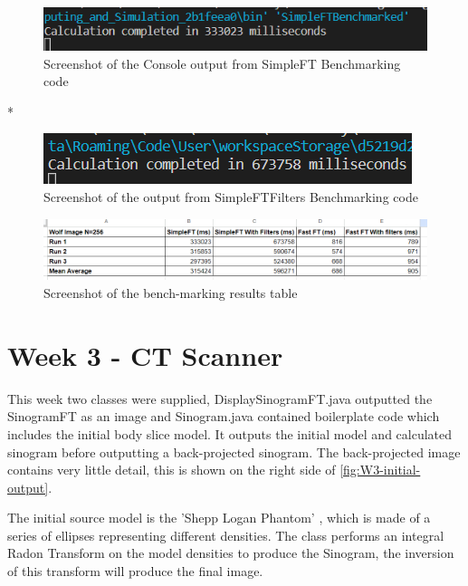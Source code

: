     \begin{figure}[H] 
        \centering
        \includegraphics[width=0.8\columnwidth]{Figures/Week 2/SimpleFT Bench.png}
        \caption{Screenshot of the Console output from SimpleFT Benchmarking code}
        \label{fig:SimpleFT-Bench}
    \end{figure}
*
    \begin{figure}[H] 
        \centering
        \includegraphics[width=0.8\columnwidth]{Figures/Week 2/SimpleFTFilters Bench.png}
        \caption{Screenshot of the output from SimpleFTFilters Benchmarking code}
        \label{fig:SimpleFTFilters-Bench}
    \end{figure}


    \begin{figure}[H] 
        \centering
        \includegraphics[width=1\columnwidth]{Figures/Week 2/Benchmarking results.png}
        \caption{Screenshot of the bench-marking results table}
        \label{fig:bench-results-table}
    \end{figure}
        

\section{Week 3 - CT Scanner}

This week two classes were supplied, DisplaySinogramFT.java outputted the SinogramFT as an image and Sinogram.java contained boilerplate code which includes the initial body slice model. It outputs the initial model and calculated sinogram before outputting a back-projected sinogram. The back-projected image contains very little detail, this is shown on the right side of \autoref{fig:W3-initial-output}.

The initial source model is the 'Shepp Logan Phantom' \textcite{6499235}, which is made of a series of ellipses representing different densities. The class performs an integral Radon Transform on the model densities to produce the Sinogram, the inversion of this transform will produce the final image. 


